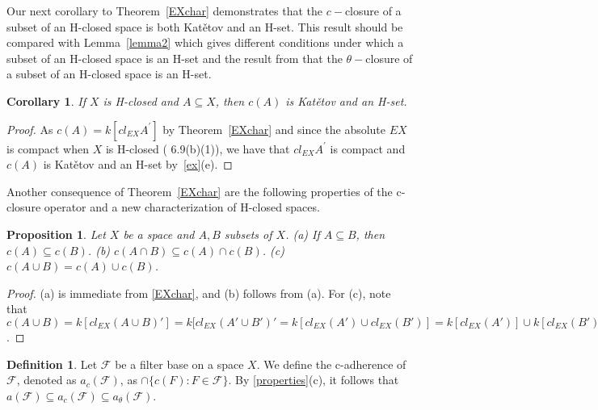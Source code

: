 \documentclass[11pt]{amsart}
\newif\ifdraft\draftfalse
\newtheorem{corollary}[theorem]{Corollary}
\newtheorem{proposition}[theorem]{Proposition}
\theoremstyle{definition}
\newtheorem{definition}[theorem]{Definition}
\theoremstyle{remark}
\numberwithin{equation}{section}
\begin{document}
Our next corollary to Theorem~\ref{EXchar} demonstrates that the $c-$closure of a subset of an H-closed space is both Kat\v etov and an H-set. This result should be compared with Lemma~\ref{lemma2} which gives different conditions under which a subset of an H-closed space is an H-set and the result from \cite{JJ} that the $\theta-$closure of a subset of an H-closed space is an H-set.

\begin{corollary}
If $X$ is H-closed and $A{\subseteq} X$, then $c(A)$ is Kat\v etov and an H-set.
\end{corollary}

\begin{proof}
As $c(A)=k[cl_{EX}A^\prime]$ by Theorem~\ref{EXchar}  and since the absolute $EX$ is compact when $X$ is H-closed (\cite{PW} 6.9(b)(1)), we have that $cl_{EX}A^\prime$ is compact and  $c(A)$ is Kat\v etov and  an H-set by~\ref{ex}(e).
\end{proof}

\vskip 3mm
Another consequence of Theorem~\ref{EXchar} are the following properties of the c-closure operator and a new characterization of H-closed spaces.

\vskip 3mm 

\begin{proposition}{{\immediate{}}{\ifdraft\hspace{-\lastskip}\vadjust{\vspace{-1mm}\smash{\llap{{\tt {{c-prop}}}\hspace{8mm}}}\vspace{1mm}}\fi}} Let $X$ be a space and $A, B$ subsets of $X$.
\newline (a) If $A \subseteq B$, then $c(A) \subseteq c(B)$.
\newline (b) $c(A \cap B) \subseteq c(A) \cap c(B)$.
\newline (c) $c(A \cup B) = c(A) \cup c(B)$.
\end{proposition}

\begin{proof} (a) is immediate from \ref{EXchar}, and (b) follows from (a).  For (c), note that $c(A \cup B)  = k[cl_{EX}(A \cup B)'] = k[cl_{EX}(A' \cup B')' = k[cl_{EX}(A') \cup cl_{EX}(B')] = k[cl_{EX}(A')] \cup k[cl_{EX}(B')] = c(A) \cup c(B)$. 
\end{proof}
\vskip 3mm
\begin{definition} Let ${\ensuremath{\mathcal{F}}}$ be a filter base on a space $X$.  We define the c-adherence of ${\ensuremath{\mathcal{F}}}$, denoted as $a_c({\ensuremath{\mathcal{F}}})$, as $\cap\{c(F):F 
\in {\ensuremath{\mathcal{F}}}\}$.  By \ref{properties}(c), it follows that $a({\ensuremath{\mathcal{F}}}) \subseteq a_c({\ensuremath{\mathcal{F}}}) \subseteq a_{\theta}({\ensuremath{\mathcal{F}}})$.
\end{definition}
\end{document}
